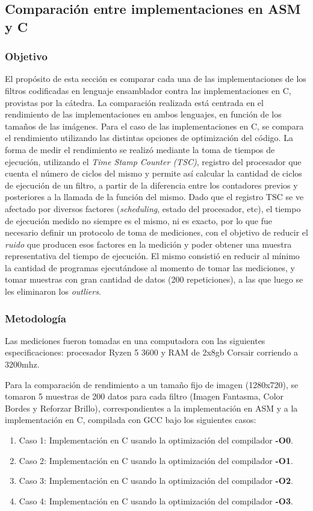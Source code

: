 \documentclass[a4paper]{article}
\begin{document}
\subsection{Comparación entre implementaciones en ASM y C}
\subsubsection{Objetivo}
\justify
El propósito de esta sección es comparar cada una de las implementaciones de los filtros codificadas en lenguaje ensamblador contra las implementaciones en C, provistas por la cátedra. La comparación realizada está centrada en el rendimiento de las implementaciones en ambos lenguajes, en función de los tamaños de las imágenes. Para el caso de las implementaciones en C, se compara el rendimiento utilizando las distintas opciones de optimización del código. 
\justify
La forma de medir el rendimiento se realizó mediante la toma de tiempos de ejecución, utilizando el \textit{Time Stamp Counter (TSC)}, registro del procesador que cuenta el número de ciclos del mismo y permite así calcular la cantidad de ciclos de ejecución de un filtro, a partir de la diferencia entre los contadores previos y posteriores a la llamada de la función del mismo. 
\justify
Dado que el registro TSC se ve afectado por diversos factores (\textit{scheduling}, estado del procesador, etc), el tiempo de ejecución medido no siempre es el mismo, ni es exacto, por lo que fue necesario definir un protocolo de toma de mediciones, con el objetivo de reducir el \textit{ruido} que producen esos factores en la medición y poder obtener una muestra representativa del tiempo de ejecución. El mismo consistió en reducir al mínimo la cantidad de programas ejecutándose al momento de tomar las mediciones, y tomar muestras con gran cantidad de datos (200 repeticiones), a las que luego se les eliminaron los \textit{outliers}.
\justify

\subsubsection{Metodología}
\justify
Las mediciones fueron tomadas en una computadora con las siguientes especificaciones: procesador Ryzen 5 3600 y RAM de 2x8gb Corsair corriendo a 3200mhz.

\justify
Para la comparación de rendimiento a un tamaño fijo de imagen (1280x720), se tomaron 5 muestras de 200 datos para cada filtro (Imagen Fantasma, Color Bordes y Reforzar Brillo), correspondientes a la implementación en ASM y a la implementación en C, compilada con GCC bajo los siguientes casos:
\begin{enumerate}
	\item Caso 1: Implementación en C usando la optimización del compilador \textbf{-O0}.
	\item Caso 2: Implementación en C usando la optimización del compilador \textbf{-O1}.
	\item Caso 3: Implementación en C usando la optimización del compilador \textbf{-O2}.
	\item Caso 4: Implementación en C usando la optimización del compilador \textbf{-O3}.
\end{enumerate}
\end{document}
